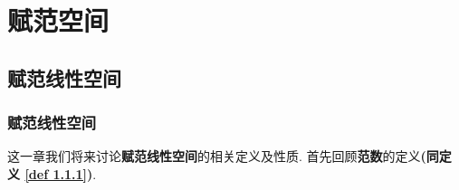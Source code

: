 \ifx\allfiles\undefined


	\else
	\fi
\chapter{赋范空间}
\section{赋范线性空间}
\subsection{赋范线性空间}
	这一章我们将来讨论\textbf{赋范线性空间}的相关定义及性质. 首先回顾\textbf{范数}的定义\textbf{(同定义 \ref{def 1.1.1})}.
	
